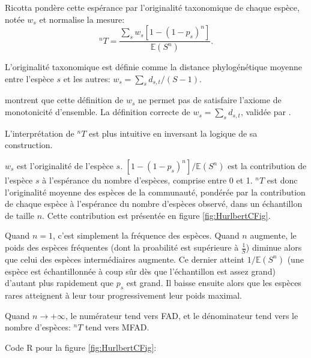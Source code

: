 \documentclass[
  11pt,
  french,
  a4paper,
  extrafontsizes,onecolumn,openright
  ]{memoir}
\begin{document}
Ricotta pondère cette espérance par l'originalité taxonomique de chaque espèce, notée \(w_s\) et normalise la mesure:
\begin{equation}
  \label{eq:Ricotta2004a}
  ^n{T}
  = \frac{\sum_s{w_s \left[ 1-\left( 1-p_s \right)^n  \right]}}{{\mathbb E}\left( S^n \right)}.
\end{equation}

L'originalité taxonomique est définie comme la distance phylogénétique moyenne entre l'espèce \(s\) et les autres: \(w_s={\sum_s{d_{s,t}}}/{(S-1)}\).

\textcite{Weikard2006} montrent que cette définition de \(w_s\) ne permet pas de satisfaire l'axiome de monotonicité d'ensemble.
La définition correcte de \(w_s=\sum_s{d_{s,t}}\), validée par \textcite{Ricotta2006}.

L'interprétation de \(^n{T}\) est plus intuitive en inversant la logique de sa construction.

\(w_s\) est l'originalité de l'espèce \(s\).
\({[1-(1-p_s)^n]}/{{\mathbb E}(S^n)}\) est la contribution de l'espèce \(s\) à l'espérance du nombre d'espèces, comprise entre 0 et 1.
\(^n{T}\) est donc l'originalité moyenne des espèces de la communauté, pondérée par la contribution de chaque espèce à l'espérance du nombre d'espèces observé, dans un échantillon de taille \(n\).
Cette contribution est présentée en figure \ref{fig:HurlbertCFig}.

Quand \(n=1\), c'est simplement la fréquence des espèces.
Quand \(n\) augmente, le poids des espèces fréquentes (dont la proabilité est supérieure à \(\frac{1}{S}\)) diminue alors que celui des espèces intermédiaires augmente.
Ce dernier atteint \({1}/{{\mathbb E}(S^n)}\) (une espèce est échantillonnée à coup sûr dès que l'échantillon est assez grand) d'autant plus rapidement que \(p_s\) est grand.
Il baisse ensuite alors que les espèces rares atteignent à leur tour progressivement leur poids maximal.

Quand \(n \to +\infty\), le numérateur tend vers FAD, et le dénominateur tend vers le nombre d'espèces: \(^n{T}\) tend vers MFAD.

Code R pour la figure \ref{fig:HurlbertCFig}:

\scriptsize
\end{document}
